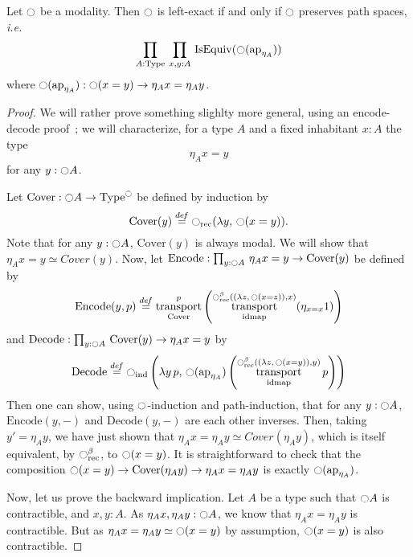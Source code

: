 \documentclass[notfinal]{jfrarticle}
\DeclareMathOperator{\Type}{Type}
\DeclareMathOperator{\IsEquiv}{IsEquiv}
\DeclareMathOperator{\idmap}{\mathrm{idmap}}
\DeclareMathOperator{\transport}{transport}
\newcommand \defeq {\overset{de\hspace{-0.2ex}f}{=}}
\newcommand{\modal}{\ensuremath{\ocircle}}
\newcommand{\prodD}[3]{\prod_{#1:#2}\, #3}
\newcommand{\ap}[1]{\mathrm{ap}_{#1}}
\newcommand{\ie}{\emph{i.e.}}
\begin{document}
\begin{prop}\label{prop:lex}
  Let $\modal$ be a modality. Then $\modal$ is left-exact if and only
  if
  $\modal$ preserves path spaces, \ie{}
    \[
      \prodD A \Type {\prodD {x,y} A {\IsEquiv (\modal (\ap{\eta_A}))}}
    \]
    where $\modal (\ap{\eta_A}) : \modal(x = y) \to \eta_A x = \eta_A
    y$.
\end{prop}
\begin{proof}
  We will rather prove something slighlty more general, using an
  encode-decode proof~\cite[Section 8.9]{hottbook}; we will
  characterize, for a type $A$ and a fixed inhabitant $x:A$ the type 
  \[ \eta_A x = y \] 
  for any $y:\modal A$.
  
  \newcommand{\Cover}{\mathrm{Cover}}
  \newcommand{\Encode}{\mathrm{Encode}}
  \newcommand{\Decode}{\mathrm{Decode}}
  Let $\Cover:\modal A \to \Type^\modal$ be defined by induction by
  \[ \Cover(y) \defeq \modal_{\mathrm{rec}} (\lambda y,\,\modal (x =
    y)). \]
  Note that for any $y:\modal A$, $\Cover(y)$ is always modal.
  We will show that $\eta_A x = y \simeq Cover(y)$.
  Now, let $\Encode : \prodD y {\modal A} {\eta_A x = y \to
    \Cover(y)}$ be defined by
  \[ \Encode(y,p) \defeq \transport_{\Cover}^p
    \left(\transport_{\idmap}^{\modal_{\mathrm{rec}}^\beta ((\lambda
        z,\,\modal (x = z)), x)} (\eta_{x=x} 1)\right) \]
  and $\Decode:\prodD y {\modal A} {\Cover(y) \to \eta_A x = y}$ by
  \[
    \Decode \defeq \modal_{\mathrm{ind}} \left(\lambda y\,p,\,
    \modal(\ap{\eta_A})  \left(\transport_{\idmap}^{\modal_{\mathrm{rec}}^\beta ((\lambda
        z,\,\modal (x = y)),y)} p\right)\right)
  \]
  Then one can show, using $\modal$-induction and path-induction, that
  for any $y:\modal A$, $\Encode(y,-)$ and $\Decode(y,-)$
  are each other inverses. Then, taking $y' = \eta_A y$, we have just
  shown that $\eta_A x = \eta_A y \simeq Cover(\eta_A y)$, which is
  itself equivalent, by $\modal_{\mathrm{rec}}^\beta$, to $\modal
  (x=y)$.
  It is straightforward to check that the composition $\modal (x=y)
  \to \Cover(\eta_A y) \to \eta_A x = \eta_A y$ is exactly $\modal
  (\ap{\eta_A})$.
  
  Now, let us prove the backward implication. Let $A$ be a type such
  that $\modal A$ is contractible, and $x,y:A$. 
  As $\eta_A x,\eta_A y: \modal A$, we know that $\eta_A x = \eta_A y$
  is contractible. But as $\eta_A x = \eta_A y \simeq \modal (x=y)$ by
  assumption, $\modal (x=y)$ is also contractible.
\end{proof}
\end{document}

